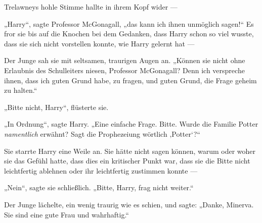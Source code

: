Trelawneys hohle Stimme hallte in ihrem Kopf wider —


„Harry“, sagte Professor McGonagall, „das kann ich ihnen unmöglich sagen!“ Es fror sie bis auf die Knochen bei dem Gedanken, dass Harry schon so viel wusste, dass sie sich nicht vorstellen konnte, wie Harry gelernt hat —

Der Junge sah sie mit seltsamen, traurigen Augen an.
„Können sie nicht ohne Erlaubnis des Schulleiters niesen, Professor McGonagall? Denn ich verspreche ihnen, dass ich guten Grund habe, zu fragen, und guten Grund, die Frage geheim zu halten.“

„Bitte nicht, Harry“, flüsterte sie.

„In Ordnung“, sagte Harry.
„Eine einfache Frage. Bitte. Wurde die Familie Potter \emph{namentlich} erwähnt? Sagt die Prophezeiung wörtlich ‚Potter‘?“

Sie starrte Harry eine Weile an. Sie hätte nicht sagen können, warum oder woher sie das Gefühl hatte, dass dies ein kritischer Punkt war, dass sie die Bitte nicht leichtfertig ablehnen oder ihr leichtfertig zustimmen konnte —

„Nein“, sagte sie schließlich.
„Bitte, Harry, frag nicht weiter.“

Der Junge lächelte, ein wenig traurig wie es schien, und sagte:
„Danke, Minerva. Sie sind eine gute Frau und wahrhaftig.“

